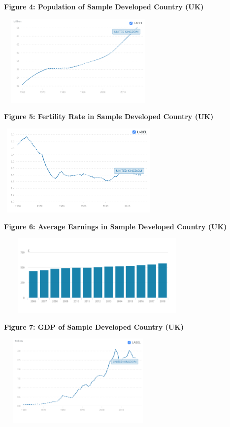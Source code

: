 \documentclass[11pt, english]{article}
\begin{document}
	\newpage

	\textbf{Figure 4: Population of Sample Developed Country (UK)}

        \begin{center}
                \includegraphics[width=8cm,height=4.5cm]{BF201-IMG/4.png}
        \end{center}

	\textbf{Figure 5: Fertility Rate in Sample Developed Country (UK)}

        \begin{center}
                \includegraphics[width=8cm,height=4.5cm]{BF201-IMG/5.png}
        \end{center}

	\textbf{Figure 6: Average Earnings in Sample Developed Country (UK)}

        \begin{center}
                \includegraphics[width=10cm,height=4cm]{BF201-IMG/6.png}
        \end{center}

	\newpage

	\textbf{Figure 7: GDP of Sample Developed Country (UK)}

        \begin{center}
                \includegraphics[width=8cm,height=4.5cm]{BF201-IMG/8.png}
        \end{center}
\end{document}
